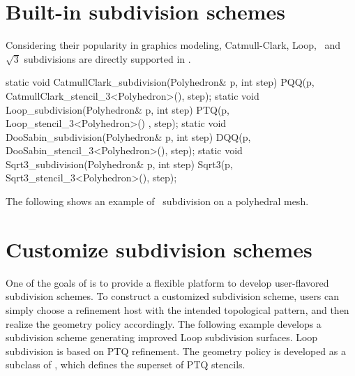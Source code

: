 



\section{Built-in subdivision schemes}
Considering their popularity in graphics modeling, 
Catmull-Clark, Loop, \DS\ and $\sqrt{3}$ subdivisions are directly
supported in . 

\begin{ccExampleCode}
  static void CatmullClark_subdivision(Polyhedron& p, int step) {
    PQQ(p, CatmullClark_stencil_3<Polyhedron>(), step);
  }
  static void Loop_subdivision(Polyhedron& p, int step) {
    PTQ(p, Loop_stencil_3<Polyhedron>() , step);
  }
  static void DooSabin_subdivision(Polyhedron& p, int step) {
    DQQ(p, DooSabin_stencil_3<Polyhedron>(), step);
  }
  static void Sqrt3_subdivision(Polyhedron& p, int step) {
    Sqrt3(p, Sqrt3_stencil_3<Polyhedron>(), step);
  }
\end{ccExampleCode}

The following shows an example of \DS\ subdivision on a polyhedral mesh.

\section{Customize subdivision schemes}
One of the goals of  is 
to provide a flexible platform
to develop user-flavored subdivision schemes.
To construct a customized subdivision scheme, users can simply 
choose a refinement host with the intended topological pattern, 
and then realize the geometry policy accordingly. 
The following example develops a subdivision scheme
generating improved Loop subdivision surfaces. Loop subdivision is
based on PTQ refinement. The geometry policy is developed as a subclass 
of , which defines the superset of PTQ stencils.

